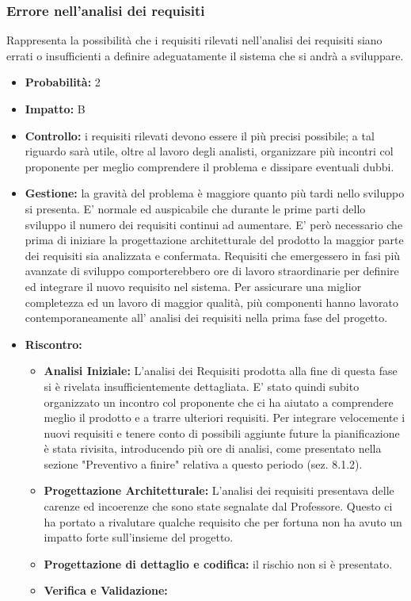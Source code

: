 \documentclass[a4paper,11pt]{article}
\begin{document}
		\subsubsection{Errore nell'analisi dei requisiti}
		Rappresenta la possibilità che i requisiti rilevati nell'analisi dei requisiti siano errati o insufficienti a definire adeguatamente il sistema che si andrà a sviluppare.
		\begin{itemize}
		\item \textbf{Probabilità:} 2
		\item \textbf{Impatto:} B
		\item \textbf{Controllo:} i requisiti rilevati devono essere il più precisi possibile; a tal riguardo sarà utile, oltre al lavoro degli analisti, organizzare più incontri col proponente per meglio comprendere il problema e dissipare eventuali dubbi.
		\item \textbf{Gestione:} la gravità del problema è maggiore quanto più tardi nello sviluppo si presenta. E' normale ed auspicabile che durante le prime parti dello sviluppo il numero dei requisiti continui ad aumentare. E' però necessario che prima di iniziare la progettazione architetturale del prodotto la maggior parte dei requisiti sia analizzata e confermata. Requisiti che emergessero in fasi più avanzate di sviluppo comporterebbero ore di lavoro straordinarie per definire ed integrare il nuovo requisito nel sistema. Per assicurare una miglior completezza ed un lavoro di maggior qualità, più componenti hanno lavorato contemporaneamente all' analisi dei requisiti nella prima fase del progetto.
		\item \textbf{Riscontro:}
			\begin{itemize}
				\item\textbf{Analisi Iniziale:} L'analisi dei Requisiti prodotta alla fine di questa fase si è rivelata insufficientemente dettagliata. E' stato quindi subito organizzato un incontro col proponente che ci ha aiutato a comprendere meglio il prodotto e a trarre ulteriori requisiti. Per integrare velocemente i nuovi requisiti e tenere conto di possibili aggiunte future la pianificazione è stata rivisita, introducendo più ore di analisi, come presentato nella sezione "Preventivo a finire" relativa a questo periodo (sez. 8.1.2).
				\item\textbf{Progettazione Architetturale:} L'analisi dei requisiti presentava delle carenze ed incoerenze che sono state segnalate dal Professore. Questo ci ha portato a rivalutare qualche requisito che per fortuna non ha avuto un impatto forte sull'insieme del progetto.
				\item\textbf{Progettazione di dettaglio e codifica:} il rischio non si è presentato.
				\item\textbf{Verifica e Validazione:}
			\end{itemize}
		\end{itemize}
		
\end{document}

